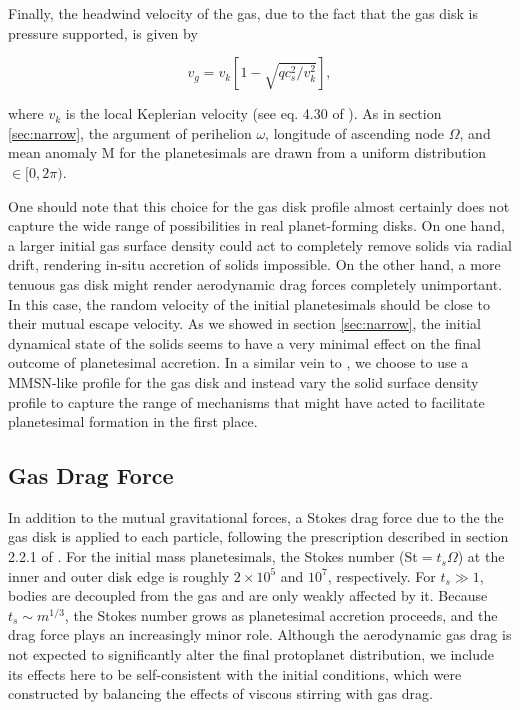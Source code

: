 \documentclass[twocolumn,linenumbers]{aastex63}
\begin{document}
Finally, the headwind velocity of the gas, due to the fact that the gas disk is pressure supported, is given by

\begin{equation}\label{eq:v_gas}
	v_{g} = v_{k} \left[ 1 - \sqrt{ q c_{s}^2 / v_{k}^2} \right],
\end{equation}

\noindent where $v_{k}$ is the local Keplerian velocity (see eq. 4.30 of \citet{armitage20}). As in section
\ref{sec:narrow}, the argument of perihelion $\omega$, longitude of
ascending node $\Omega$, and mean anomaly M for the planetesimals are drawn from a uniform distribution $\in [0, 2 \pi)$.

One should note that this choice for the gas disk profile almost certainly does not capture the wide range of possibilities in real planet-forming disks. 
On one hand, a larger initial gas surface density could act to completely remove solids via radial drift, rendering in-situ accretion of solids impossible. On the 
other hand, a more tenuous gas disk might render aerodynamic drag forces completely unimportant. In this case, the random velocity of the initial 
planetesimals should be close to their mutual escape velocity. As we showed in section \ref{sec:narrow}, the initial dynamical state of the solids seems to 
have a very minimal effect on the final outcome of planetesimal accretion. In a similar vein to \citet{hansen12}, we choose to use a MMSN-like profile for the 
gas disk and instead vary the solid surface density profile to capture the range of mechanisms that might have acted to facilitate planetesimal formation in the 
first place.

\subsection{Gas Drag Force}

In addition to the mutual gravitational forces, a Stokes drag force
due to the the gas disk is applied to each particle, following the
prescription described in section 2.2.1 of \citet{morishima10}. For
the initial mass planetesimals, the Stokes number
  ($\textrm{St} = t_{s} \Omega$) at the inner and outer disk edge is
  roughly $2 \times 10^{5}$ and $10^{7}$, respectively. For $t_{s} \gg
  1$, bodies are decoupled from the gas and are only weakly affected
  by it. Because $t_{s} \sim m^{1/3}$, the Stokes number grows as planetesimal accretion proceeds, and the drag force plays an increasingly minor role. Although the aerodynamic gas drag is not expected to significantly alter the final protoplanet distribution, we include its effects here to be self-consistent with the initial conditions, which were constructed by balancing the effects of viscous stirring with gas drag.
\end{document}

